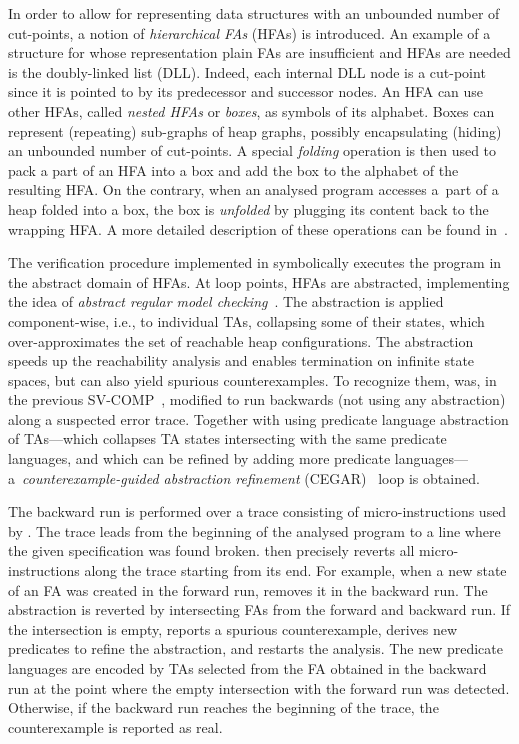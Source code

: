 In order to allow for representing data structures with an unbounded number of
cut-points, a notion of \emph{hierarchical FAs} (HFAs) is introduced. An example
of a structure for whose representation plain FAs are insufficient and HFAs are needed is the doubly-linked
list (DLL). Indeed, each internal DLL node is a cut-point since it is pointed to by its
predecessor and successor nodes. An HFA can use other HFAs, called \emph{nested
HFAs} or \emph{boxes}, as symbols of its alphabet. Boxes can represent
(repeating) sub-graphs of heap graphs, possibly encapsulating (hiding) an
unbounded number of cut-points. A special \emph{folding} operation is then used
to pack a part of an HFA into a box and add the box to the alphabet of the
resulting HFA. On the contrary, when an analysed program accesses a~part of a
heap folded into a box, the box is \emph{unfolded} by plugging its content
back to the wrapping HFA. A more detailed description of these operations
can be found in~\cite{fmsd12,cav13}.

The verification procedure implemented in \forester{} symbolically executes the
program in the abstract domain of HFAs.
At loop points, HFAs are abstracted, implementing the idea of \emph{abstract
regular model checking}~\cite{sttt12}. The abstraction is applied
component-wise, i.e., to individual TAs, collapsing some of their states, which
over-approximates the set of reachable heap configurations. The abstraction
speeds up the reachability analysis and enables termination on infinite state
spaces, but can also yield spurious counterexamples. To recognize them,
\forester{} was, in the previous SV-COMP~\cite{svcomp16}, modified to run
backwards (not using any abstraction) along a suspected
error trace. Together with using predicate language
abstraction of TAs---which collapses TA states intersecting with the same predicate
languages, and which can be refined by adding more predicate
languages---a~\emph{counterexample-guided abstraction refinement} (CEGAR)~\cite{clarke:CEGAR} loop is obtained.

The backward run is performed over a trace consisting of micro-instructions used
by \forester{}. The trace leads from the beginning of the analysed program to a
line where the given specification was found broken. \forester{} then
precisely reverts all micro-instructions along the trace starting from its end.
For example, when a new state of an FA was created in the forward run, \forester{}
removes it in the backward run. The abstraction is reverted by intersecting FAs
from the forward and backward run. If the intersection is empty, \forester{}
reports a spurious counterexample, derives new predicates to refine the
abstraction, and restarts the analysis. The new predicate languages are encoded
by TAs selected from the FA obtained in the backward run at the point where the
empty intersection with the forward run was detected. Otherwise, if the backward run reaches the beginning of the
trace, the counterexample is reported as real.

